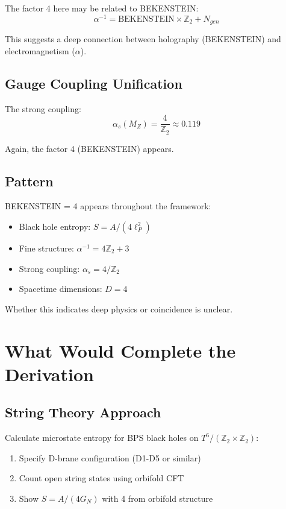 \documentclass[12pt,a4paper]{article}
\begin{document}
The factor 4 here may be related to BEKENSTEIN:
\begin{equation}
\alpha^{-1} = \text{BEKENSTEIN} \times \mathbb{Z}_2 + N_{gen}
\end{equation}

This suggests a deep connection between holography (BEKENSTEIN) and electromagnetism ($\alpha$).

\subsection{Gauge Coupling Unification}

The strong coupling:
\begin{equation}
\alpha_s(M_Z) = \frac{4}{\mathbb{Z}_2} \approx 0.119
\end{equation}

Again, the factor 4 (BEKENSTEIN) appears.

\subsection{Pattern}

BEKENSTEIN = 4 appears throughout the framework:
\begin{itemize}
    \item Black hole entropy: $S = A/(4\ell_P^2)$
    \item Fine structure: $\alpha^{-1} = 4\mathbb{Z}_2 + 3$
    \item Strong coupling: $\alpha_s = 4/\mathbb{Z}_2$
    \item Spacetime dimensions: $D = 4$
\end{itemize}

Whether this indicates deep physics or coincidence is unclear.

\section{What Would Complete the Derivation}

\subsection{String Theory Approach}

Calculate microstate entropy for BPS black holes on $T^6/(\mathbb{Z}_2 \times \mathbb{Z}_2)$:
\begin{enumerate}
    \item Specify D-brane configuration (D1-D5 or similar)
    \item Count open string states using orbifold CFT
    \item Show $S = A/(4G_N)$ with 4 from orbifold structure
\end{enumerate}
\end{document}
